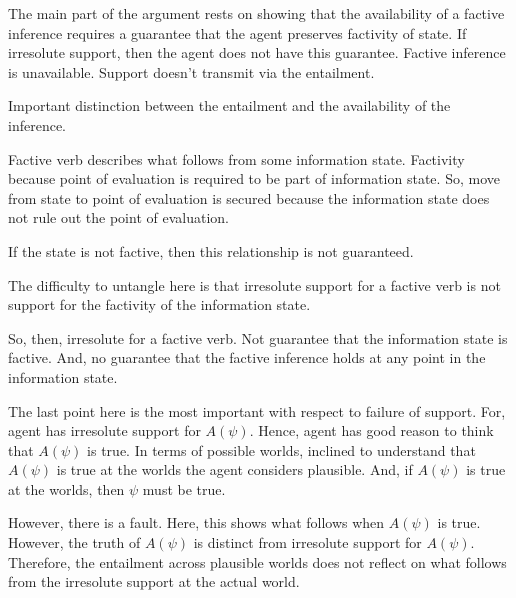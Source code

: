 \documentclass[10pt]{article}
\begin{document}
\begin{note}[Continuing]
  The main part of the argument rests on showing that the availability of a factive inference requires a guarantee that the agent preserves factivity of state.
  If irresolute support, then the agent does not have this guarantee.
  Factive inference is unavailable.
  Support doesn't transmit via the entailment.

  Important distinction between the entailment and the availability of the inference.

  Factive verb describes what follows from some information state.
  Factivity because point of evaluation is required to be part of information state.
  So, move from state to point of evaluation is secured because the information state does not rule out the point of evaluation.

  If the state is not factive, then this relationship is not guaranteed.

  The difficulty to untangle here is that irresolute support for a factive verb is not support for the factivity of the information state.

  So, then, irresolute for a factive verb.
  Not guarantee that the information state is factive.
  And, no guarantee that the factive inference holds at any point in the information state.

  The last point here is the most important with respect to failure of support.
  For, agent has irresolute support for \(A(\psi)\).
  Hence, agent has good reason to think that \(A(\psi)\) is true.
  In terms of possible worlds, inclined to understand that \(A(\psi)\) is true at the worlds the agent considers plausible.
  And, if \(A(\psi)\) is true at the worlds, then \(\psi\) must be true.

  However, there is a fault.
  Here, this shows what follows when \(A(\psi)\) is true.
  However, the truth of \(A(\psi)\) is distinct from irresolute support for \(A(\psi)\).
  Therefore, the entailment across plausible worlds does not reflect on what follows from the irresolute support at the actual world.
\end{note}
\end{document}
